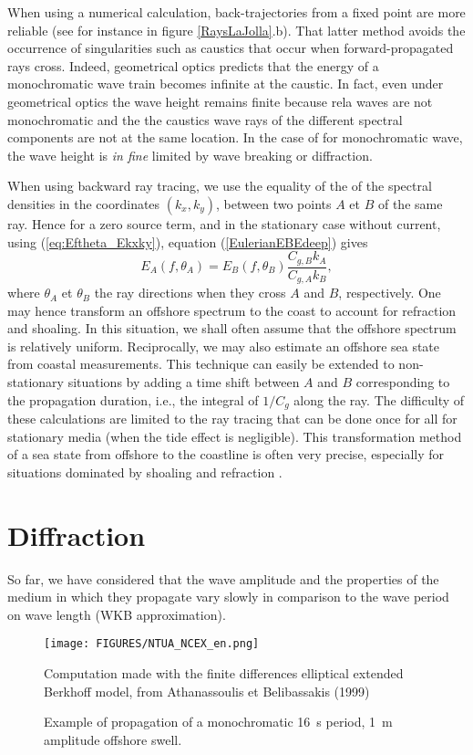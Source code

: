  When using a numerical calculation, back-trajectories from a fixed point are more reliable 
 (see for instance in figure \ref{RaysLaJolla}.b). That latter method avoids the occurrence of singularities such as 
 caustics that occur when forward-propagated rays cross. Indeed, geometrical optics predicts that the energy of a monochromatic wave train becomes infinite at the caustic. In fact, even under geometrical optics the 
wave height remains finite because rela waves are not monochromatic and the the caustics wave rays of the different spectral components are not at the same location. In the case of for monochromatic wave, the wave height is \textit{in fine} limited by wave breaking
or diffraction.  

When using backward ray tracing, we use the equality of the
 of the spectral densities in the coordinates $(k_x,k_y)$, between two points $A$ et $B$ 
 of the same ray. Hence for a zero source term, and in the stationary case without current, 
 using (\ref{eq:Eftheta_Ekxky}), equation (\ref{EulerianEBEdeep}) gives
 \begin{equation}
 E_A(f,\theta_A)=E_B(f,\theta_B)\frac{C_{g,B} k_A}{C_{g,A} k_B}\label{eq:ray_model},
\end{equation}
where $\theta_A$ et $\theta_B$ the ray directions when they cross $A$ and $B$, respectively.
One may hence transform an offshore spectrum to the coast to account for refraction and shoaling.
In this situation, we shall often assume that the offshore  spectrum is relatively uniform. 
Reciprocally, we may also estimate an offshore sea state from coastal measurements.
This technique can easily be extended to non-stationary situations by adding a time shift between
$A$ and $B$ corresponding to the propagation duration, i.e., the integral of $1/C_g$ along the ray.
The difficulty of these calculations are limited to the ray tracing that can be done once for all 
for stationary media (when the tide effect is negligible). This transformation method of a sea state
from offshore to the coastline is often very precise, especially for situations dominated by shoaling
and refraction \citep{OReilly&Guza1993,Ardhuin&al.2003a,Ardhuin2006a,Magne&al.2007}.





\section{Diffraction}
So far, we have considered that the wave amplitude and the properties of the medium in which they
propagate vary slowly in comparison to the wave period on wave length (WKB approximation).
\begin{figure}
\centerline{\texttt{[image: FIGURES/NTUA\_NCEX\_en.png]}}
  \caption{Example of propagation of a monochromatic 16~s period, 1~m amplitude offshore swell.}
  {Computation made with the finite differences elliptical extended Berkhoff model, from Athanassoulis et Belibassakis
  (1999)}
   \label{NTUA_NCEX}
  \end{figure}

